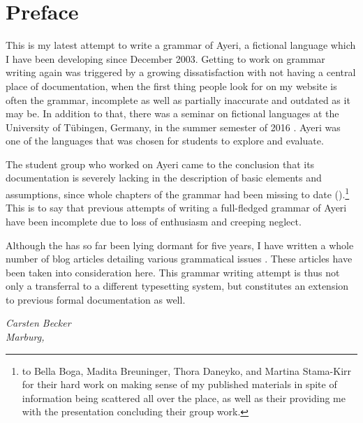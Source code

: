 
\chapter{Preface}

This is my latest attempt to write a grammar of Ayeri, a fictional language 
which I have been developing since December 2003. Getting to work on grammar 
writing again was triggered by a growing dissatisfaction with not having a 
central place of documentation, when the first thing people look for on my 
website is often the grammar, incomplete as well as partially inaccurate and 
outdated as it may be. In addition to that, there was a seminar on fictional 
languages at the University of Tübingen, Germany, in the summer semester of 
2016 \autocite{buch2016ss}. Ayeri was one of the languages that was chosen for 
students to explore and evaluate.

The student group who worked on Ayeri came to the conclusion that its
documentation is severely lacking in the description of basic elements and
assumptions, since whole chapters of the grammar had been missing to date
(\cite[12]{boga2016}).\footnote{
to Bella Boga, Madita Breuninger, Thora Daneyko, and Martina Stama-Kirr for
their hard work on making sense of my published materials in spite of
information being scattered all over the place, as well as their providing me
with the presentation concluding their group work.} This is to say that
previous attempts of writing a full-fledged grammar of Ayeri have been
incomplete due to loss of enthusiasm and creeping neglect.

Although the  has so far been lying dormant for five years,
I have written a whole number of blog articles detailing various grammatical
issues \autocite[Blog]{benung}. These articles have been taken into
consideration here. This grammar writing attempt is thus not only a transferral
to a different typesetting system, but constitutes an extension to previous
formal documentation as well.

\begin{flushright}\itshape\footnotesize
Carsten Becker\\
Marburg,  \the\year
\end{flushright}